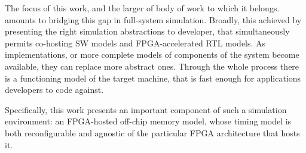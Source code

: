The focus of this work, and the larger of body of work to which it belongs.
amounts to bridging this gap in full-system simulation. Broadly, this achieved
by presenting the right simulation abstractions to developer, that
simultaneously permits co-hosting SW models and FPGA-accelerated RTL models. As
implementations, or more complete models of components of the system become
available, they can replace more abstract ones. Through the whole process there
is a functioning model of the target machine, that is fast enough for
applications developers to code against.

Specifically, this work presents an important component of such a simulation
environment: an FPGA-hosted off-chip memory model, whose timing model is both
reconfigurable and agnostic of the particular FPGA architecture that hosts it.




